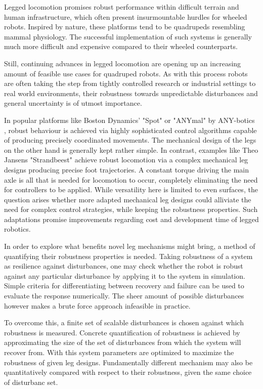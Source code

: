Legged locomotion promises robust performance within difficult terrain and human infrastructure, which often present insurmountable hurdles for wheeled robots. Inspired by nature, these platforms tend to be quadrupeds resembling mammal physiology. The successful implementation of such systems is generally much more difficult and expensive compared to their wheeled counterparts. 

Still, continuing advances in legged locomotion are opening up an increasing amount of feasible use cases for quadruped robots. As with this process robots are often taking the step from tightly controlled research or industrial settings to real world environments, their robustness towards unpredictable disturbances and general uncertainty is of utmost importance. 

In popular platforms like Boston Dynamics' "Spot" \cite{spot} or "ANYmal" by ANY-botics \cite{anymal}, robust behaviour is achieved via highly sophisticated control algorithms capable of producing precisely coordinated movements. The mechanical design of the legs on the other hand is generally kept rather simple. In contrast, examples like Theo Jansens "Strandbeest" \cite{jansen} achieve robust locomotion via a complex mechanical leg designs producing precise foot trajectories. A constant torque driving the main axle is all that is needed for locomotion to occur, completely eliminating the need for controllers to be applied.   
While versatility here is limited to even surfaces, the question arises whether more adapted mechanical leg designs could alliviate the need for complex control strategies, while keeping the robustness properties. Such adaptations promise improvements regarding cost and development time of legged robotics.

In order to explore what benefits novel leg mechanisms might bring, a method of quantifying their robustness properties is needed. Taking robustness of a system as resilience against disturbances, one may check whether the robot is robust against any particular disturbance by applying it to the system in simulation. Simple criteria for differentiating between recovery and failure can be used to evaluate the response numerically. The sheer amount of possible disturbances however makes a brute force approach infeasible in practice. 

To overcome this, a finite set of scalable disturbances is chosen against which robustness is measured. Concrete quantification of robustness is achieved by approximating the size of the set of disturbances from which the system will recover from. 
With this system parameters are optimized to maximize the robustness of given leg designs. Fundamentally different mechanism may also be quantitatively compared with respect to their robustness, given the same choice of disturbanc set.


